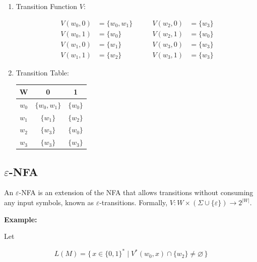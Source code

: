 \documentclass[12pt,a4paper,openany]{article}
\begin{document}
\begin{enumerate}
    \item Transition Function $V$:
    
    \[
    \begin{aligned}
        V(w_0, 0) &= \{w_0, w_1\} \qquad & V(w_2, 0) &= \{w_3\} \\
        V(w_0, 1) &= \{w_0\}        \qquad & V(w_2, 1) &= \{w_0\} \\
        V(w_1, 0) &= \{w_1\}        \qquad & V(w_3, 0) &= \{w_3\} \\
        V(w_1, 1) &= \{w_2\}        \qquad & V(w_3, 1) &= \{w_3\}
    \end{aligned}
    \]



    \item Transition Table: 
    
    \begin{center}
    \begin{tabular}{c|cc}
    \textbf{W} & \textbf{0} & \textbf{1} \\
    \hline
    $w_0$ & $\{w_0, w_1\}$ & $\{w_0\}$ \\
    $w_1$ & $\{w_1\}$ & $\{w_2\}$ \\
    $w_2$ & $\{w_3\}$ & $\{w_0\}$ \\
    $w_3$ & $\{w_3\}$ & $\{w_3\}$ \\
    \end{tabular}
    \end{center}

\end{enumerate}

\subsection{$\varepsilon$-NFA}

An $\varepsilon$-NFA is an extension of the NFA that allows transitions without consuming any input symbols, known as $\varepsilon$-transitions. Formally, $V : W \times (\Sigma \cup \{\varepsilon\}) \to 2^{|W|}$.


\textbf{Example:}

Let

\[
L(M) = \{\, x \in \{0,1\}^* \mid V^*(w_0, x) \cap \{w_2\} \neq \varnothing \,\}
\]

\begin{center}
\end{center}
\end{document}
